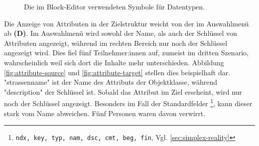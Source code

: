 \begin{figure}
  \centering
  \caption{Die im Block-Editor verwendeten Symbole für Datentypen. \\}
  \label{fig:icons}
\end{figure}

Die Anzeige von Attributen in der Zielstruktur weicht von der im Auswahlmenü ab \textbf{(D)}. Im Auswahlmenü wird sowohl der Name, als auch der Schlüssel von Attributen angezeigt, während im rechten Bereich nur noch der Schlüssel angezeigt wird. Dies fiel fünf Teilnehmer:innen auf, zumeist im dritten Szenario, wahrscheinlich weil sich dort die Inhalte mehr unterschieden. Abbildung \ref{fig:attribute-source} und \ref{fig:attribute-target} stellen dies beispielhaft dar. "strassenname" ist der Name des Attributs der Objektklasse, während "description" der Schlüssel ist. Sobald das Attribut im Ziel erscheint, wird nur noch der Schlüssel angezeigt. Besonders im Fall der Standardfelder \footnote{\texttt{ndx, key, typ, nam, dsc, cmt, beg, fin}, Vgl. \ref{sec:simplex-reality}}, kann dieser stark vom Name abweichen. Fünf Personen waren davon verwirrt.

